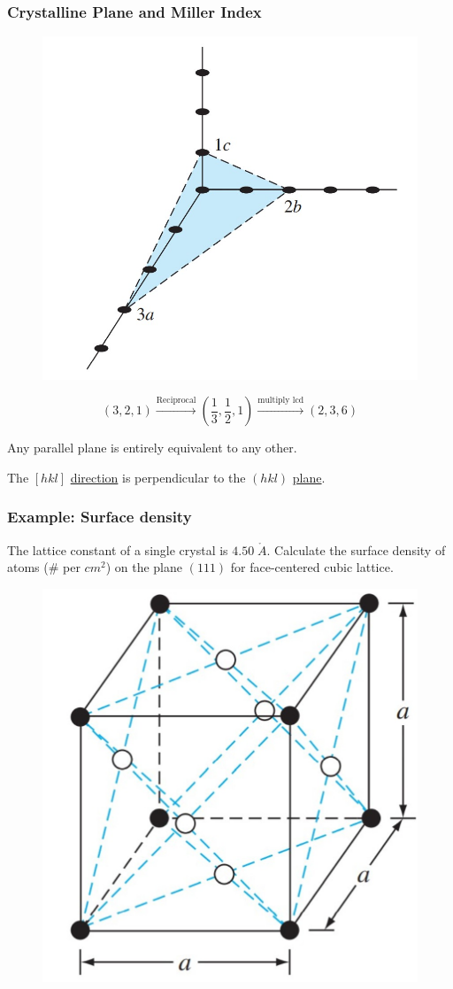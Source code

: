 \documentclass{beamer}
\begin{document}
    \begin{frame} \frametitle{Crystalline Plane and Miller Index}
        \begin{figure}[H]
            \centering
            \includegraphics[width=0.4\linewidth]{Miller-index-1.jpg}
            \label{fig:Miller-index-1.jpg}
        \end{figure}
        \begin{equation*}
            (3,2,1) \stackrel{\text{Reciprocal}}{\longrightarrow} (\frac{1}{3} , \frac{1}{2} , 1) \stackrel{\text{multiply lcd}}{\longrightarrow} (2,3,6)
        \end{equation*}
        

        \par Any parallel plane is entirely equivalent to any other.

        \par The $[hkl]$ \underline{direction} is perpendicular to the $(hkl)$ \underline{plane}.
    \end{frame}

    \begin{frame} \frametitle{Example: Surface density}
        \par The lattice constant of a single crystal is $4.50 \; \mathring{A}$. Calculate the surface density of atoms (\# per $cm^2$) on the plane $(111)$ for face-centered cubic lattice.
        \begin{figure}[H]
            \begin{flushleft}
                \includegraphics[width=0.4\linewidth]{Example-surface-density.jpg}
            \end{flushleft}
            \label{fig:Example-surface-density.jpg}
        \end{figure}
    \end{frame}
\end{document}
